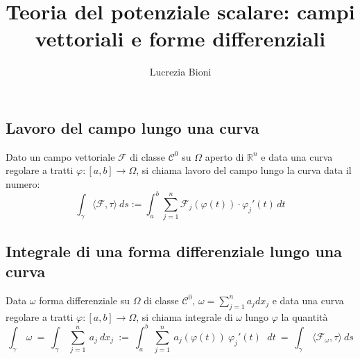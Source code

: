 \documentclass{article} %
\title{Teoria del potenziale scalare: campi vettoriali e forme differenziali} %
\author{Lucrezia Bioni} %
\date{} %
\begin{document}
    \maketitle

    \subsection*{Lavoro del campo lungo una curva}
    Dato un campo vettoriale $\mathcal{F} $ di classe $ \mathcal{C} ^0 $ su $\Omega$ aperto di $ \mathbb{R} ^n $
    e data una curva regolare a tratti $\varphi:[a,b]\to \Omega $, si chiama lavoro del campo lungo la curva data il numero:
    $$ \int _\gamma \langle \mathcal{F} , \tau \rangle \  ds := \int_{a}^{b} \sum_{j = 1}^{n}  \mathcal{F}_j(\varphi (t)) \cdot \varphi_j ' (t) \,dt  $$

    \subsection*{Integrale di una forma differenziale lungo una curva}
    Data $\omega $ forma differenziale su $\Omega $ di classe $ \mathcal{C} ^0 $, $ \omega = \sum_{j = 1}^{n} a_j dx_j $
    e data una curva regolare a tratti $\varphi:[a,b]\to \Omega $, si chiama integrale di $\omega$ lungo $\varphi$ la quantità
    $$ \int _\gamma  \ \omega \ = \ \int _\gamma \ \sum_{j = 1}^{n} \ a_j \ dx_j\ :=\  \int_{a}^{b} \ \sum_{j = 1}^{n} \ a_j ( \varphi (t) ) \ \varphi_j ' (t) \,\ \ dt \ = \ \int _\gamma \ \langle \mathcal{F} _\omega , \tau \rangle \  ds  $$
\end{document}
